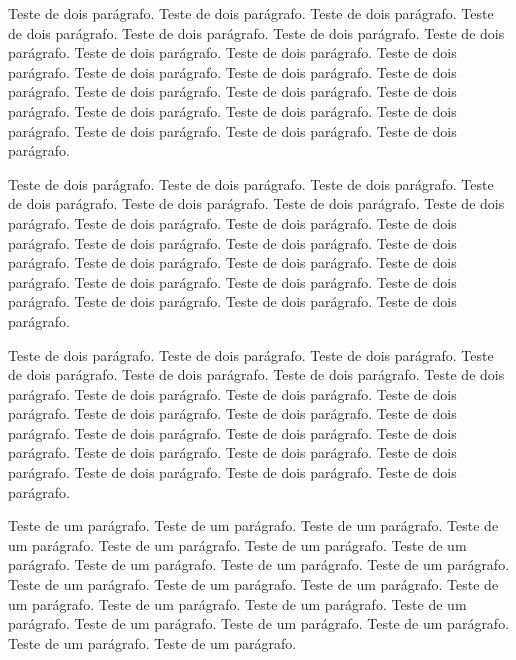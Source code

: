 \documentclass[12pt]{article}
\begin{document}
Teste de dois parágrafo. Teste de dois parágrafo. Teste de dois parágrafo. Teste de dois parágrafo. Teste de dois parágrafo. Teste de dois parágrafo. Teste de dois parágrafo. Teste de dois parágrafo. Teste de dois parágrafo. Teste de dois parágrafo. Teste de dois parágrafo. Teste de dois parágrafo. Teste de dois parágrafo. Teste de dois parágrafo. Teste de dois parágrafo. Teste de dois parágrafo. Teste de dois parágrafo. Teste de dois parágrafo. Teste de dois parágrafo. Teste de dois parágrafo. Teste de dois parágrafo. Teste de dois parágrafo.

Teste de dois parágrafo. Teste de dois parágrafo. Teste de dois parágrafo. Teste de dois parágrafo. Teste de dois parágrafo. Teste de dois parágrafo. Teste de dois parágrafo. Teste de dois parágrafo. Teste de dois parágrafo. Teste de dois parágrafo. Teste de dois parágrafo. Teste de dois parágrafo. Teste de dois parágrafo. Teste de dois parágrafo. Teste de dois parágrafo. Teste de dois parágrafo. Teste de dois parágrafo. Teste de dois parágrafo. Teste de dois parágrafo. Teste de dois parágrafo. Teste de dois parágrafo. Teste de dois parágrafo.



Teste de dois parágrafo. Teste de dois parágrafo. Teste de dois parágrafo. Teste de dois parágrafo. Teste de dois parágrafo. Teste de dois parágrafo. Teste de dois parágrafo. Teste de dois parágrafo. Teste de dois parágrafo. Teste de dois parágrafo. Teste de dois parágrafo. Teste de dois parágrafo. Teste de dois parágrafo. Teste de dois parágrafo. Teste de dois parágrafo. Teste de dois parágrafo. Teste de dois parágrafo. Teste de dois parágrafo. Teste de dois parágrafo. Teste de dois parágrafo. Teste de dois parágrafo. Teste de dois parágrafo.

Teste de um parágrafo. Teste de um parágrafo. Teste de um parágrafo. Teste de um parágrafo. Teste de um parágrafo. Teste de um parágrafo. Teste de um parágrafo. Teste de um parágrafo. Teste de um parágrafo. Teste de um parágrafo. Teste de um parágrafo. Teste de um parágrafo. Teste de um parágrafo. Teste de um parágrafo. Teste de um parágrafo. Teste de um parágrafo. Teste de um parágrafo. Teste de um parágrafo. Teste de um parágrafo. Teste de um parágrafo. Teste de um parágrafo. Teste de um parágrafo.
\end{document}
